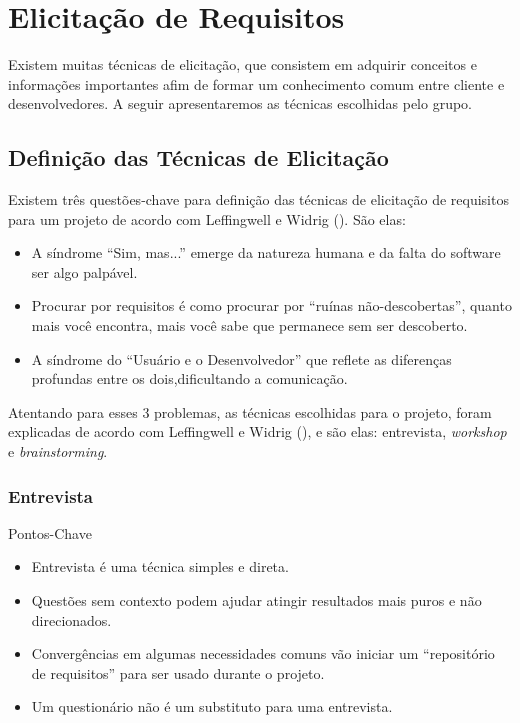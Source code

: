 \chapter[Elicitação de Requisitos]{Elicitação de Requisitos}

  Existem muitas técnicas de elicitação, 
  que consistem em adquirir conceitos e informações importantes afim de formar um conhecimento 
  comum entre cliente e desenvolvedores. A seguir apresentaremos as técnicas escolhidas pelo grupo.
    
  \section{Definição das Técnicas de Elicitação}
  
    Existem três questões-chave para definição das técnicas de elicitação de requisitos para um projeto
    de acordo com Leffingwell e Widrig (\citeyear{leffingwell99}). São elas:
    
    \begin{itemize}
     \item A síndrome “Sim, mas...” emerge da natureza humana e da falta do software ser algo palpável.
     \item Procurar por requisitos é como procurar por “ruínas não-descobertas”, quanto mais você encontra, mais você sabe que permanece sem ser descoberto.
     \item A síndrome do “Usuário e o Desenvolvedor” que reflete as diferenças profundas entre os dois,dificultando a comunicação.
    \end{itemize}
    
    Atentando para esses 3 problemas, as técnicas escolhidas para o projeto, foram explicadas de acordo com  Leffingwell e Widrig (\citeyear{leffingwell99}), e são elas: entrevista, \textit{workshop} e \textit{brainstorming}.
    
    \subsection{Entrevista}
      
      Pontos-Chave
    
      \begin{itemize}
       \item Entrevista é uma técnica simples e direta. 
       \item Questões sem contexto podem ajudar atingir resultados mais puros e não direcionados.
       \item Convergências em algumas necessidades comuns vão iniciar um “repositório de requisitos” para ser usado durante o projeto. 
       \item Um questionário não é um substituto para uma entrevista.
      \end{itemize}
    
